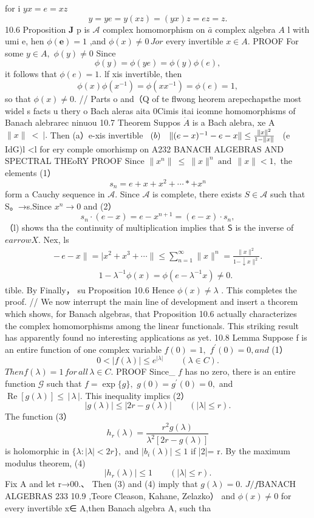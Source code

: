 for i $y x=e=x z$ $$ y=y e=y(x z)=(y x)z=e z=z. $$ 10.6 Proposition ${\boldsymbol{J}}$ p is $\textstyle{\mathcal{A}}$ complex homomorphism on $\bar{a}$ complex algebra $\scriptstyle A$ l with umi e, hen $\phi({\boldsymbol{e}})=1$ ,and $\phi(x)\neq0\,J o r$ every invertible $x\in A.$ PROOF For some $y\in A,$ $\phi(y)\neq0$ Since $$ \phi(y)=\phi(y e)=\phi(y)\phi(e), $$ it follows that $\phi(e)=1.$ lf xis invertible, then $$ \phi(x)\phi(x^{-1})=\phi(x x^{-1})=\phi(e)=1, $$ so that $\phi(x)\neq0.$ // Parts o and（Q of te flwong heorem arepechapsthe most widel s facts u thery o Bach aleras aita 0Cimis itai icomne homomorphisms of Banach alebrarec ninuou 10.7 Theorem Suppos $\scriptstyle{\dot{A}}$ is a Bach alebra, xe A $\|x\|\ <\ |.$ Then (a）e-xis invertible $\begin{array}{c l c r}{(b)}&{\|(e-x)^{-1}-e-x\|\leq{\frac{\|x\|^{2}}{1-\|x\|}}}\end{array}$ (e IdG)l <l for ery comple omorhismp on A232 BANACH ALGEBRAS AND SPECTRAL THEoRY PROOF Since $\|x^{n}\|\ \leq\ \|x\|^{n}\ \mathrm{and}\ \ \|x\|<1,$ the elements (1） $$ s_{n}=e+x+x^{2}+\cdots*+x^{n} $$ form a Cauchy sequence in ${\mathcal{A}}.$ Since $\scriptstyle{\mathcal{A}}$ is complete, there exists $S\in{\mathcal{A}}$ such that S。→s.Since $x^{n}\to0$ and (2） $$ s_{n}\cdot(e-x)=e-x^{n+1}=(e-x)\cdot s_{n}, $$ （l) shows tha the continuity of multiplication implies that $\boldsymbol{\mathsf{S}}$ is the inverse of $e arrow X.$ Nex, ls $$ \begin{array}{l}{{-\,e-x\parallel=|x^{2}+x^{3}+\cdots\parallel\leq\sum_{n=1}^{\infty}\|x\|^{n}=\frac{\|x\|^{2}}{1-\downarrow x\|^{2}}.}}\\ {{\,\,\,\,\,\,\,\,\,\,\,\,\,\,\,\,\,\,\,\,\,\,\,\,\,\,\,\,\,\,\,\,1-\lambda^{-1}\phi(x)=\phi(e-\lambda^{-1}x)\not=0.\,\,\,\,\,\,\,\,}}\end{array} $$ tible. By Finally， su Proposition 10.6 Hence $\phi(x)\neq\lambda$ . This completes the proof. // We now interrupt the main line of development and insert a thcorem which shows, for Banach algebras, that Proposition 10.6 actually characterizes the complex homomorphisms among the linear functionals. This striking result has apparently found no interesting applications as yet. 10.8 Lemma Suppose f is an entire function of one complex variable $f(0)=1,$ $f^{\prime}(0)=0,a n d$ (1） $$ 0<|f(\lambda)|\leq e^{|\lambda|}\qquad(\lambda\in C). $$ $T h e n f(\lambda)=1\,f o r\,a l l\,\lambda\in C.$ PROOF Since_ $\boldsymbol{\mathit{f}}$ has no zero, there is an entire function $\scriptstyle{\mathcal{G}}$ such that $f=\exp{\{g\}},$ $g(0)=g^{\prime}(0)=0,$ and $\operatorname{Re}\left[g(\lambda)\right]\leq\,\left|\,\lambda\,\right|.$ This inequality implics (2） $$ |g(\lambda)|\leq|2r-g(\lambda)|\qquad(|\lambda|\leq r). $$ The function (3） $$ h_{r}(\lambda)=\frac{r^{2}g(\lambda)}{\lambda^{2}[2r-g(\lambda)]} $$ is holomorphic in $\{\lambda\colon|\lambda|<2r\},$ and $|b_{i}(\lambda)|\leq1$ if |2|= r. By the maximum modulus theorem, (4) $$ \left|h_{r}(\lambda)\right|\leq1\qquad(\left|\lambda\right|\leq r). $$ Fix A and let r→00.、 Then (3) and (4) imply that $g(\lambda)=0.$ $J/f$BANACH ALGEBRAS 233 10.9 ,Teore Cleason, Kahane, Zelazko） and $\phi(x)\neq0$ for every invertible x∈ A,then Banach algebra A, such tha 